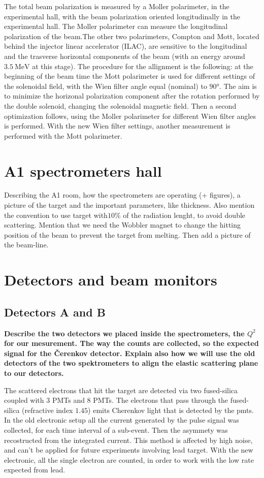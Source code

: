 The total beam polarization is measured by a Moller polarimeter, in the experimental hall, with the beam polarization oriented longitudinally in the experimental hall. The Moller polarimeter can measure the longitudinal polarization of the beam.The other two polarimeters, Compton and Mott, located behind the injector linear accelerator (ILAC), are sensitive to the longitudinal and the trasverse horizontal components of the beam (with an energy around $\SI{3.5}{\mega \electronvolt}$ at this stage). The procedure for the allignment is the following: at the beginning of the beam time the Mott polarimeter is used for different settings of the solenoidal field, with the Wien filter angle equal (nominal) to $\ang{90}$. The aim is to minimize the horizonal polarization component after the rotation performed by the double solenoid, changing the solenoidal magnetic field. Then a second optimization follows, using the Moller polarimeter for different Wien filter angles is performed. With the new Wien filter settings, another measurement is performed with the Mott polarimeter.


\section{A1 spectrometers hall}

Describing the A1 room, how the spectrometers are operating (+ figures), a picture of the target and the important parameters, like thickness. Also mention the convention to use target with$10 \%$ of the radiation lenght, to avoid double scattering.  Mention that we need the Wobbler magnet to change the hitting position of the beam to prevent the target from melting.
Then add a picture of the beam-line.

\section{Detectors and beam monitors}

\subsection{Detectors A and B}
{\bfseries Describe the two detectors we placed inside the spectrometers, the $Q^{2}$ for our mesurement. The way the counts are collected, so the expected signal for the Čerenkov detector. Explain also how we will use the old detectors of the two spektrometers to align the elastic scattering plane to our detectors.}

The scattered electrons that hit the target are detected via two fused-silica coupled with 3 PMTs and 8 PMTs. The electrons that pass through the fused-silica (refractive index $1.45$) emits Cherenkov light that is detected by the pmts. In the old electronic setup all the current generated by the pulse signal was collected, for each time interval of a sub-event. Then the asymmety was recostructed from the integrated current. This method is affected by high noise, and can't be applied for future experiments involving lead target.
With the new electronic, all the single electron are counted, in order to work with the low rate expected from lead.


